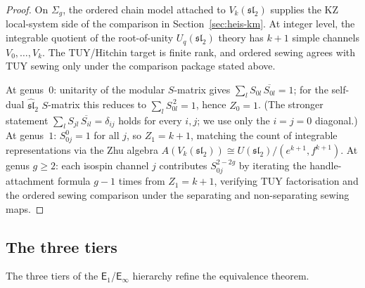 \documentclass[11pt,reqno]{amsart}
\theoremstyle{definition}
\theoremstyle{remark}
\newcommand{\Eone}{\mathsf{E}_{1}}
\newcommand{\Einf}{\mathsf{E}_{\infty}}
\numberwithin{equation}{section}
\begin{document}
\begin{proof}
On $\Sigma_g$, the ordered chain model attached to
$V_k(\mathfrak{sl}_2)$ supplies the KZ local-system side of the comparison in
Section~\ref{sec:heis-km}. At integer level, the integrable quotient
of the root-of-unity \(U_q(\mathfrak{sl}_2)\) theory has
$k + 1$ simple channels $V_0, \ldots, V_k$.  The TUY/Hitchin target is
finite rank, and ordered sewing agrees with TUY sewing only under the
comparison package stated above.

At genus~$0$: unitarity of the modular $S$-matrix gives
$\sum_l S_{0l}\,\overline{S_{0l}} = 1$; for the self-dual
$\widehat{\mathfrak{sl}}_2$ $S$-matrix this reduces to
$\sum_l S_{0l}^{\,2} = 1$, hence $Z_0 = 1$.
(The stronger statement $\sum_l S_{jl}\,\overline{S_{il}} = \delta_{ij}$
holds for every $i,j$; we use only the $i=j=0$ diagonal.)
At genus~$1$: $S_{0j}^0 = 1$ for all $j$, so $Z_1 = k + 1$,
matching the count of integrable representations via
the Zhu algebra $A(V_k(\mathfrak{sl}_2))
\cong U(\mathfrak{sl}_2)/(e^{k+1}, f^{k+1})$.
At genus $g \geq 2$: each isospin channel $j$ contributes
$S_{0j}^{2 - 2g}$ by iterating the handle-attachment formula
$g - 1$ times from $Z_1 = k + 1$, verifying TUY factorisation and the
ordered sewing comparison under the separating and non-separating
sewing maps.
\end{proof}

\subsection{The three tiers}

The three tiers of the $\Eone$/$\Einf$ hierarchy refine
the equivalence theorem.
\end{document}
